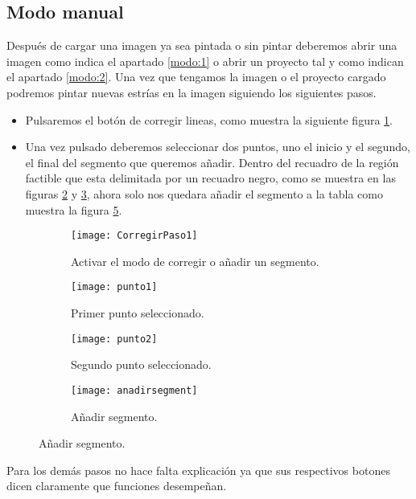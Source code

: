\subsection{Modo manual}
Después de cargar una imagen ya sea pintada o sin pintar deberemos abrir una imagen como indica el apartado \ref{modo:1} o abrir un proyecto tal y como indican el apartado \ref{modo:2}.
Una vez que tengamos la imagen o el proyecto cargado podremos pintar nuevas estrías en la imagen siguiendo los siguientes pasos.

\begin{itemize}
\item Pulsaremos el botón de corregir lineas, como muestra la siguiente figura \ref{fig:CorregirPaso1}.

\item Una vez pulsado deberemos seleccionar dos puntos, uno el inicio y el segundo, el final del segmento que queremos añadir. 
Dentro del recuadro de la región factible que esta delimitada por un recuadro negro, como se muestra en las figuras \ref{fig:punto1} y \ref{fig:punto2}, ahora solo nos quedara añadir el segmento a la tabla como muestra la figura \ref{fig:anadirsegment}.
\end{itemize}

\begin{figure}
	\begin{subfigure}[c]{.5\linewidth}
	\centering\large \texttt{[image: CorregirPaso1]}
	\caption{Activar el modo de corregir o añadir un segmento.}\label{fig:CorregirPaso1}
	\end{subfigure}%
	\begin{subfigure}[c]{.5\linewidth}
	\centering\large \texttt{[image: punto1]}
	\caption{Primer punto seleccionado.}\label{fig:punto1}
	\end{subfigure}%
	
	\begin{subfigure}[c]{.5\linewidth}
	\centering\large \texttt{[image: punto2]}
	\caption{Segundo punto seleccionado.}\label{fig:punto2}
	\end{subfigure}%
	\begin{subfigure}[c]{.5\linewidth}
	\centering\large \texttt{[image: anadirsegment]}
	\caption{Añadir segmento.}\label{fig:anadirsegment}
	\end{subfigure}%
\end{figure}

	
Para los demás pasos no hace falta explicación ya que sus respectivos botones dicen claramente que funciones desempeñan.	
	
